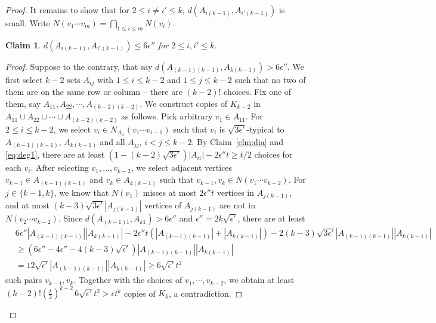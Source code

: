 \documentclass[reqno]{amsart}
\theoremstyle{plain}
\newtheorem{claim}[theorem]{Claim}
\def\eps{\epsilon}
\def\sqe{\sqrt{3\epsilon'}}
\begin{document}
\begin{proof}
It remains to show that for $2\le i \ne i'\le k$, $d(A_{i(k-1)},A_{i'(k-1)})$ is small.
Write $N(v_1 \cdots v_m)=\bigcap_{1\le i\le m} N(v_i)$.

\begin{claim} \label{clm:row1}
$d(A_{i(k-1)},A_{i'(k-1)})\le 6 \epsilon''$ for $2\le i,i'\le k$.
\end{claim}

\begin{proof}
Suppose to the contrary, that say $d(A_{(k-1)(k-1)},A_{k(k-1)})> 6 \epsilon''$. 
We first select $k-2$ sets $A_{ij}$ with $1\le i\le k-2$ and $1\le j\le k-2$ such that no two of them are on the same row or column -- there are $(k-2)!$ choices. Fix one of them, say $A_{11},A_{22},\cdots,A_{(k-2)(k-2)}$. We construct copies of $K_{k-2}$ in $A_{11} \cup A_{22} \cup \cdots \cup A_{(k-2)(k-2)}$ as follows. Pick arbitrary $v_1\in A_{11}$.
For $2 \le i\le k-2$, we select $v_i\in N_{A_{ii}}(v_1 \cdots v_{i-1})$ such that $v_i$ is $\sqe$-typical to $A_{(k-1)(k-1)}$, $A_{k(k-1)}$ and all $A_{jj}$, $i< j\le k-2$. By Claim~\ref{clm:dia} and \eqref{eq:deg1}, there are at least $(1- (k-2)\sqe) |A_{ii}| - 2 \eps'' t \ge t/2$ choices for each $v_i$.
After selecting $v_1, \dots, v_{k-2}$, we select adjacent vertices $v_{k-1}\in A_{(k-1)(k-1)}$ and $v_k\in A_{k(k-1)}$ such that $v_{k-1}, v_k \in N(v_1 \cdots v_{k-2})$. For $j\in \{k-1, k\}$, we know that $N(v_1)$ misses at most $2 \eps'' t$ vertices in $A_{j(k-1)}$, and at most $(k-3)\sqe |A_{j(k-1)}|$ vertices of $A_{j(k-1)}$ are not in $N(v_2 \cdots v_{k-2})$. Since $d(A_{(k-1)1},A_{k1})> 6 \epsilon''$ and $\eps''= 2k\sqrt{\eps'}$, there are at least
\begin{align*}
&6 \eps'' |A_{(k-1)(k-1)}| |A_{k(k-1)}| - 2\eps'' t (|A_{(k-1)(k-1)}| + |A_{k(k-1)}|) - 2 (k-3)\sqe |A_{(k-1)(k-1)}| |A_{k(k-1)}|\\
&\ge (6\eps''- 4\eps''- 4 (k-3) \sqrt{\eps'} )|A_{(k-1)(k-1)}| |A_{k(k-1)}|\\
& = 12 \sqrt{\eps'} |A_{(k-1)(k-1)}| |A_{k(k-1)}| \ge 6 \sqrt{\eps'} t^2
\end{align*}
such pairs $v_{k-1}, v_k$. Together with the choices of $v_1, \cdots, v_{k-2}$, we obtain at least $(k-2)!(\tfrac{t}{2})^{k-2} \, 6\sqrt{\eps'} t^2 > \eps t^k$ copies of $K_k$,
a contradiction.
\end{proof}


\end{proof}
\end{document}
